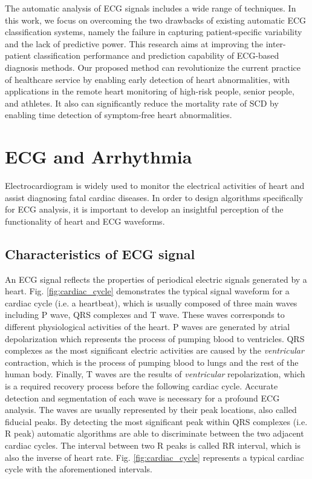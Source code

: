 The automatic analysis of ECG signals includes a wide range of techniques. In this work, we focus on overcoming the two drawbacks of existing automatic ECG classification systems, namely the failure in capturing patient-specific variability and the lack of predictive power. %
This research aims at improving the inter-patient classification performance and prediction capability of ECG-based diagnosis methods. Our proposed method can revolutionize the current practice of healthcare service by enabling early detection of heart abnormalities, with applications in the remote heart monitoring of high-risk people, senior people, and athletes. It also can significantly reduce the mortality rate of SCD by enabling time detection of symptom-free heart abnormalities. %

\section{ECG and Arrhythmia}\label{sec:ecg}

Electrocardiogram is widely used to monitor the electrical activities of heart and assist diagnosing fatal cardiac diseases. In order to design algorithms specifically for ECG analysis, it is important to develop an insightful perception of the functionality of heart and ECG waveforms.  

\subsection{Characteristics of ECG signal}

An ECG signal reflects the properties of periodical electric signals generated by a heart. Fig. \ref{fig:cardiac_cycle} demonstrates the typical signal waveform for a cardiac cycle (i.e. a heartbeat), which is usually composed of three main waves including P wave, QRS complexes and T wave. These waves corresponds to different physiological activities of the heart. P waves are generated by atrial depolarization which represents the process of pumping blood to ventricles. QRS complexes as the most significant electric activities are caused by the \textit{ventricular} contraction, which is the process of pumping blood to lungs and the rest of the human body. Finally, T waves are the results of \textit{ventricular} repolarization, which is a required recovery process before the following cardiac cycle. Accurate detection and segmentation of each wave is necessary for a profound ECG analysis. The waves are usually represented by their peak locations, also called fiducial peaks. By detecting the most significant peak within QRS complexes (i.e. R peak) automatic algorithms are able to discriminate between the two adjacent cardiac cycles. The interval between two R peaks is called RR interval, which is also the inverse of heart rate. Fig. \ref{fig:cardiac_cycle} represents a typical cardiac cycle with the aforementioned intervals.

